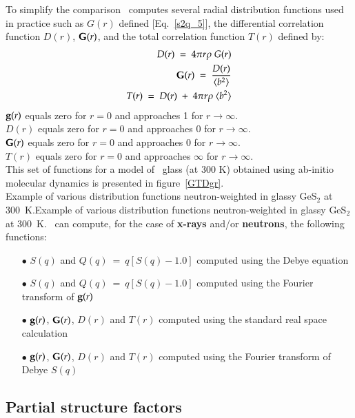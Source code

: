 To simplify the comparison \atomes\ computes several radial distribution functions used in practice such as $G(r)$ defined [Eq.~\ref{s2q_5}], the differential correlation function $D(r)$, ${\bf{G}}(r)$, and the total correlation function $T(r)$ defined by:
\begin{eqnarray}
\label{s2q_9}
D(r)\ =\ 4\pi r \rho\ G(r) \\ \nonumber
{\bf{G}}(r)\ =\ \frac{D(r)}{\langle b^{2} \rangle} \\ 
T(r)\ =\ D(r)\ +\ 4\pi r \rho\ \langle b^{2} \rangle \nonumber
\end{eqnarray}
${\bf{g}}(r)$ equals zero for $r=0$ and approaches 1 for $r\to\infty$. \\
$D(r)$ equals zero for $r=0$ and approaches 0 for $r\to\infty$. \\
${\bf{G}}(r)$ equals zero for $r=0$ and approaches 0 for $r\to\infty$. \\
$T(r)$ equals zero for $r=0$ and approaches $\infty$ for $r\to\infty$. \\[0.25cm]
This set of functions for a model of \ges\ glass (at 300 K) obtained using ab-initio molecular dynamics is presented in figure~\ref{GTDgr}. \\
{Example of various distribution functions neutron-weighted in glassy GeS$_2$ at 300~K.}{Example of various distribution functions neutron-weighted in glassy GeS$_2$ at 300~K.}
\newpage
\noindent \atomes\ can compute, for the case of {\bf{x-rays}} and/or {\bf{neutrons}}, the following functions: 
\begin{itemize}
\item[$\bullet$] $S(q)$ and $Q(q)\ =\ q[S(q)-1.0]$ \cite{EurJM.14-233.2002, jac.17-61.1984} computed using the Debye equation
\item[$\bullet$] $S(q)$ and $Q(q)\ =\ q[S(q)-1.0]$ \cite{EurJM.14-233.2002, jac.17-61.1984} computed using the Fourier transform of ${\bf{g}}(r)$
\item[$\bullet$] ${\bf{g}}(r)$, ${\bf{G}}(r)$, $D(r)$ and $T(r)$ computed using the standard real space calculation
\item[$\bullet$] ${\bf{g}}(r)$, ${\bf{G}}(r)$, $D(r)$ and $T(r)$ computed using the Fourier transform of Debye $S(q)$
\end{itemize}

\subsection{Partial structure factors}


